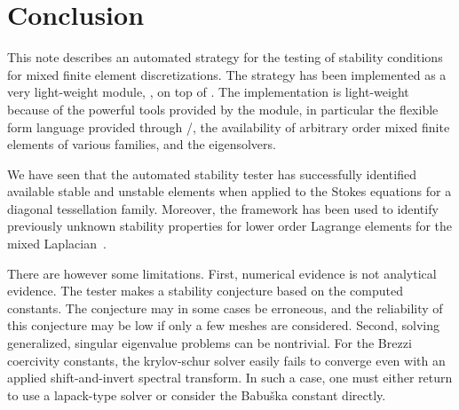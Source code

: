 \section{Conclusion}
\label{rognes:sec:conclusion}


This note describes an automated strategy for the testing of stability
conditions for mixed finite element discretizations. The strategy has
been implemented as a very light-weight \rognespython{} module,
\rognesascot{}, on top of \pydolfin{}. The implementation is
light-weight because of the powerful tools provided by the \pydolfin{}
module, in particular the flexible form language provided through
\ufl{}/\ffc{}, the availability of arbitrary order mixed finite
elements of various families, and the \slepc{} eigensolvers.

We have seen that the automated stability tester has successfully
identified available stable and unstable elements when applied to the
Stokes equations for a diagonal tessellation family. Moreover, the
framework has been used to identify previously unknown stability
properties for lower order Lagrange elements for the mixed
Laplacian~\cite{ArnoldRognes2009}.

There are however some limitations. First, numerical evidence is not
analytical evidence. The tester makes a stability conjecture based on
the computed constants. The conjecture may in some cases be erroneous,
and the reliability of this conjecture may be low if only a few meshes
are considered. Second, solving generalized, singular eigenvalue
problems can be nontrivial. For the Brezzi coercivity constants, the
krylov-schur solver easily fails to converge even with an applied
shift-and-invert spectral transform. In such a case, one must either
return to use a lapack-type solver or consider the Babu\v ska constant
directly.



